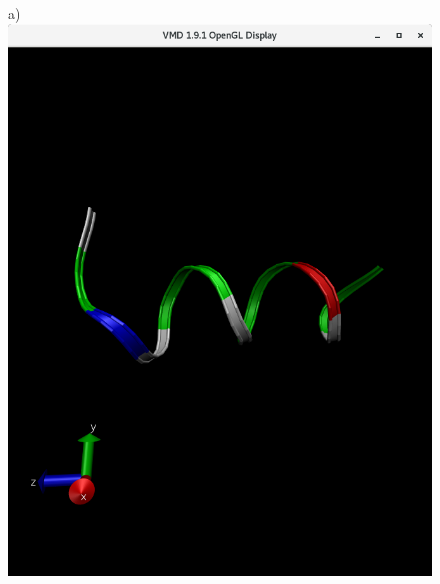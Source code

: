 \documentclass[12pt, onecolumn]{revtex4}    %
\begin{document}
\begin{figure}[h!]
a)\includegraphics[scale=0.2]{First01}\\


\end{figure}
\end{document}
